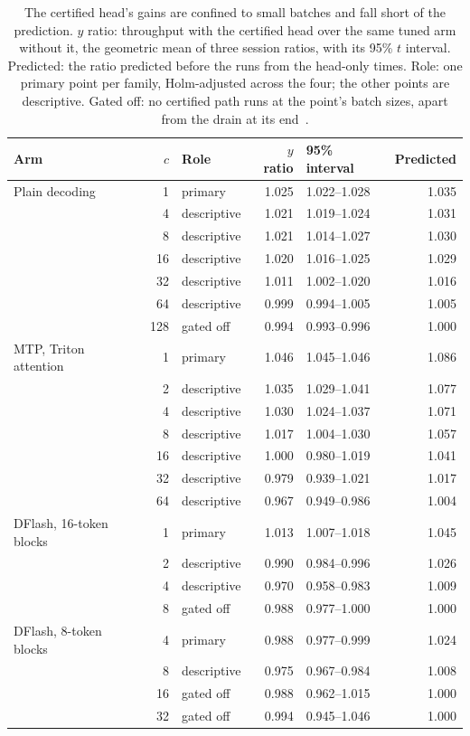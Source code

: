 \begin{table}[htbp]
\newcommand*{\ci}[1]{\textcolor{muted}{#1}}
\caption{The certified head's gains are confined to small batches and fall short of the prediction. $y$ ratio: throughput with the certified head over the same tuned arm without it, the geometric mean of three session ratios, with its 95\% $t$ interval. Predicted: the ratio predicted before the runs from the head-only times. Role: one primary point per family, Holm-adjusted across the four; the other points are descriptive. Gated off: no certified path runs at the point's batch sizes, apart from the drain at its end~.}\label{tab:cert-served}
\vskip 0.05in
\centering\tablefont\setlength{\tabcolsep}{4pt}
\begin{tabular}{@{}lrlrlr@{}}
\toprule
Arm & $c$ & Role & $y$ ratio & \ci{95\% interval} & Predicted\\\midrule
Plain decoding & 1 & primary & 1.025 & \ci{1.022--1.028} & 1.035\\
 & 4 & descriptive & 1.021 & \ci{1.019--1.024} & 1.031\\
 & 8 & descriptive & 1.021 & \ci{1.014--1.027} & 1.030\\
 & 16 & descriptive & 1.020 & \ci{1.016--1.025} & 1.029\\
 & 32 & descriptive & 1.011 & \ci{1.002--1.020} & 1.016\\
 & 64 & descriptive & 0.999 & \ci{0.994--1.005} & 1.005\\
 & 128 & gated off & 0.994 & \ci{0.993--0.996} & 1.000\\
\addlinespace[2pt]
MTP, Triton attention & 1 & primary & 1.046 & \ci{1.045--1.046} & 1.086\\
 & 2 & descriptive & 1.035 & \ci{1.029--1.041} & 1.077\\
 & 4 & descriptive & 1.030 & \ci{1.024--1.037} & 1.071\\
 & 8 & descriptive & 1.017 & \ci{1.004--1.030} & 1.057\\
 & 16 & descriptive & 1.000 & \ci{0.980--1.019} & 1.041\\
 & 32 & descriptive & 0.979 & \ci{0.939--1.021} & 1.017\\
 & 64 & descriptive & 0.967 & \ci{0.949--0.986} & 1.004\\
\addlinespace[2pt]
DFlash, 16-token blocks & 1 & primary & 1.013 & \ci{1.007--1.018} & 1.045\\
 & 2 & descriptive & 0.990 & \ci{0.984--0.996} & 1.026\\
 & 4 & descriptive & 0.970 & \ci{0.958--0.983} & 1.009\\
 & 8 & gated off & 0.988 & \ci{0.977--1.000} & 1.000\\
\addlinespace[2pt]
DFlash, 8-token blocks & 4 & primary & 0.988 & \ci{0.977--0.999} & 1.024\\
 & 8 & descriptive & 0.975 & \ci{0.967--0.984} & 1.008\\
 & 16 & gated off & 0.988 & \ci{0.962--1.015} & 1.000\\
 & 32 & gated off & 0.994 & \ci{0.945--1.046} & 1.000\\
\bottomrule
\end{tabular}
\end{table}

